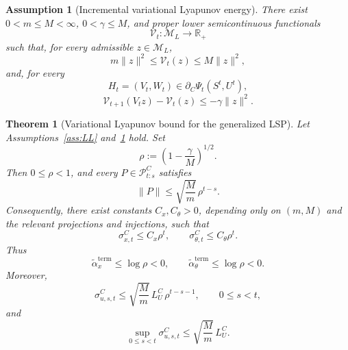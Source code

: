 \documentclass[10pt,a4paper]{amsart}
\newtheorem{assumption}{Assumption}
\newtheorem{theorem}{Theorem}
\begin{document}
\begin{assumption}[Incremental variational Lyapunov energy]
\label{ass:var-energy-main}
There exist \(0<m\le M<\infty\), \(0<\gamma\le M\), and proper lower
semicontinuous functionals
\[
\mathcal{V}_t:\mathcal{M}_L\to\mathbb{R}_+
\]
such that, for every admissible \(z\in\mathcal{M}_L\),
\[
m\|z\|^2
\le
\mathcal{V}_t(z)
\le
M\|z\|^2 ,
\]
and, for every
\[
H_t=(V_t,W_t)\in\partial_C\Psi_t(S^t,U^t),
\]
\[
\mathcal{V}_{t+1}(V_tz)-\mathcal{V}_t(z)
\le
-\gamma\|z\|^2 .
\]
\end{assumption}

\begin{theorem}[Variational Lyapunov bound for the generalized LSP]
\label{thm:fundamental-variational-main}
Let Assumptions~\ref{ass:LL} and~\ref{ass:var-energy-main} hold. Set
\[
\rho:=\left(1-\frac{\gamma}{M}\right)^{1/2}.
\]
Then \(0\le\rho<1\), and every \(P\in\mathcal{P}_{t:s}^C\) satisfies
\[
\|P\|
\le
\sqrt{\frac{M}{m}}\,\rho^{t-s}.
\]
Consequently, there exist constants \(C_x,C_\theta>0\), depending only on
\((m,M)\) and the relevant projections and injections, such that
\[
\sigma_{x,t}^C\le C_x\rho^t,
\qquad
\sigma_{\theta,t}^C\le C_\theta\rho^t .
\]
Thus
\[
\tilde\alpha_x^{\mathrm{term}}\le\log\rho<0,
\qquad
\tilde\alpha_\theta^{\mathrm{term}}\le\log\rho<0 .
\]
Moreover,
\[
\sigma_{u,s,t}^C
\le
\sqrt{\frac{M}{m}}\,L_U^C\,\rho^{t-s-1},
\qquad
0\le s<t,
\]
and
\[
\sup_{0\le s<t}\sigma_{u,s,t}^C
\le
\sqrt{\frac{M}{m}}\,L_U^C .
\]
\end{theorem}
\end{document}
